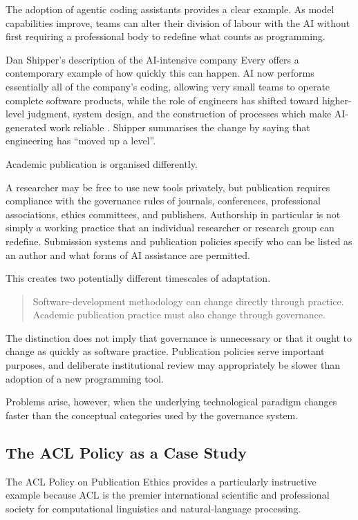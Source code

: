 The adoption of agentic coding assistants provides a clear example. As model capabilities improve, teams can alter their division of labour with the AI without first requiring a professional body to redefine what counts as programming.

Dan Shipper's description of the AI-intensive company Every offers a contemporary example of how quickly this can happen. AI now performs essentially all of the company's coding, allowing very small teams to operate complete software products, while the role of engineers has shifted toward higher-level judgment, system design, and the construction of processes which make AI-generated work reliable \citep{newton2026editorclone}. Shipper summarises the change by saying that engineering has ``moved up a level''.

Academic publication is organised differently.

A researcher may be free to use new tools privately, but publication requires compliance with the governance rules of journals, conferences, professional associations, ethics committees, and publishers. Authorship in particular is not simply a working practice that an individual researcher or research group can redefine. Submission systems and publication policies specify who can be listed as an author and what forms of AI assistance are permitted.

This creates two potentially different timescales of adaptation.

\begin{quote}
Software-development methodology can change directly through practice. Academic publication practice must also change through governance.
\end{quote}

The distinction does not imply that governance is unnecessary or that it ought to change as quickly as software practice. Publication policies serve important purposes, and deliberate institutional review may appropriately be slower than adoption of a new programming tool.

Problems arise, however, when the underlying technological paradigm changes faster than the conceptual categories used by the governance system.


\subsection{The ACL Policy as a Case Study}

The ACL Policy on Publication Ethics provides a particularly instructive example because ACL is the premier international scientific and professional society for computational linguistics and natural-language processing.

